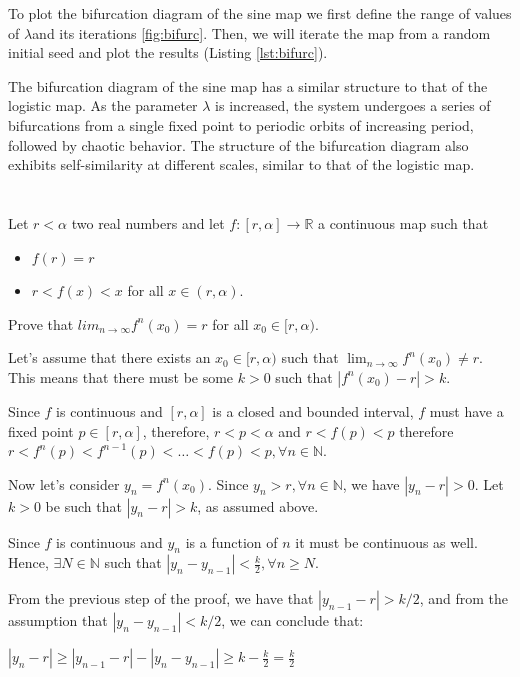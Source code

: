 \documentclass[11pt]{article}
\begin{document}
To plot the bifurcation diagram of the sine map we first define the range of values of $\lambda $and its iterations \ref{fig:bifurc}. Then, we will iterate the map from a random initial seed and plot the results (Listing \ref{lst:bifurc}).

The bifurcation diagram of the sine map has a similar structure to that of the logistic map. As the parameter $\lambda$ is increased, the system undergoes a series of bifurcations from a single fixed point to periodic orbits of increasing period, followed by chaotic behavior. The structure of the bifurcation diagram also exhibits self-similarity at different scales, similar to that of the logistic map.

\hypertarget{7}{%
\section{}\label{7}} Let $r < α$ two real numbers and let $f : [r, α] → \mathbb{R}$ a continuous map such that
\begin{itemize}
    \item $f (r) = r$
    \item $r < f (x) < x$ for all $x ∈ (r, α)$.
\end{itemize}
 Prove that $lim_{n \rightarrow \infty} f^{n}(x_{0}) = r $ for all $x_{0} ∈ [r, α)$.

 Let's assume that there exists an $x_0 \in [r,\alpha)$ such that $\lim_{n\to\infty} f^n(x_0) \neq r$. This means that there must be some $k > 0$ such that $|f^n(x_0) - r| > k$. 

Since $f$ is continuous and $[r,\alpha]$ is a closed and bounded interval, $f$ must have a fixed point $p \in [r,\alpha]$, therefore, $r < p < \alpha$ and $r < f(p) < p$ therefore $r < f^n(p) < f^{n-1}(p) < \dots < f(p) < p, \forall n\in\mathbb{N}$. 

Now let's consider $y_n = f^n(x_0)$. Since $y_n > r, \forall n\in\mathbb{N}$, we have $|y_n - r| > 0$. Let $k > 0$ be such that $|y_n - r| > k$, as assumed above.

Since $f$ is continuous and $y_n$ is a function of $n$ it must be continuous as well. Hence, $\exists N \in \mathbb{N}$ such that $|y_n - y_{n-1}| < \frac{k}{2}, \forall n \geq N$. 

From the previous step of the proof, we have that $|y_{n-1} - r| > k/2$, and from the assumption that $|y_n - y_{n-1}| < k/2$, we can conclude that:

$|y_n -r| \geq |y_{n-1} - r| - |y_n - y_{n-1} | \ge k - \frac{k}{2} = \frac{k}{2}$
\end{document}
